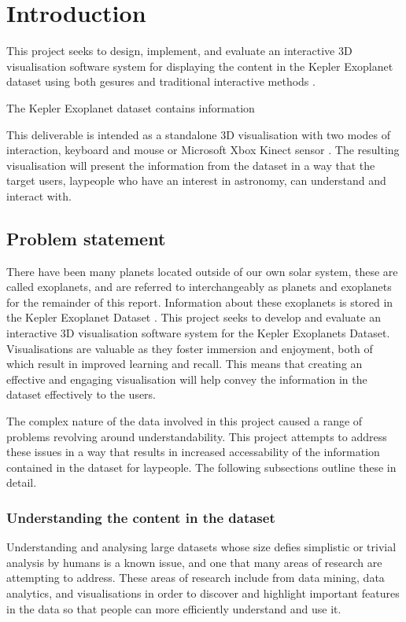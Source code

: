 \chapter{Introduction}\label{C:intro}
This project seeks to design, implement, and evaluate an interactive 3D
visualisation software system for displaying the content in the Kepler
Exoplanet dataset using both gesures and traditional interactive methods
\cite{dataset}.

The Kepler Exoplanet dataset contains information  


This deliverable is intended as a standalone
3D visualisation with two modes of interaction, keyboard and mouse or Microsoft
Xbox Kinect sensor \cite{kinect}. The resulting visualisation will present the
information from the dataset in a way that the target users, laypeople who have
an
interest in astronomy, can understand and interact with.
\section{Problem statement}
There have been many planets located outside of our own solar system,
these are called exoplanets, and are referred to interchangeably as planets and
exoplanets for the remainder of this report. Information about these exoplanets
is stored in the Kepler Exoplanet Dataset
\cite{dataset}. This project seeks to develop and evaluate an interactive 3D
visualisation software system for the Kepler Exoplanets Dataset. Visualisations
are valuable as they foster immersion and enjoyment, both of which result in
improved learning and recall. This means that
creating an effective and engaging visualisation will help convey the
information
in the dataset effectively to the users.

The complex nature of the data involved in this project caused a range of
problems revolving around understandability. This project
attempts to address these issues in a way that results in increased
accessability of the information contained in the dataset for laypeople. The
following subsections outline these in detail.

\subsection{Understanding the content in the dataset}
Understanding and analysing large datasets whose size defies simplistic or
trivial analysis by humans is a known issue, and one that many areas of research
are
attempting to address. These areas of research include from data mining, data
analytics, and visualisations in order to discover and highlight important
features in the data so that people can more efficiently understand and use it. 

